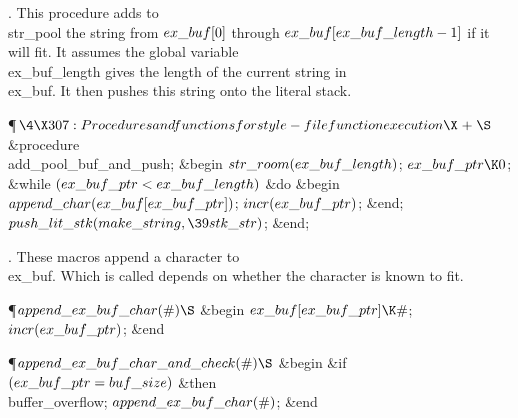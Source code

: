 .
This procedure adds to \\{str\_pool} the string from $\\{ex\_buf}[0]$ through
$\\{ex\_buf}[\\{ex\_buf\_length}-1]$ if it will fit.  It assumes the global
variable \\{ex\_buf\_length} gives the length of the current string in
\\{ex\_buf}.  It then pushes this string onto the literal stack.

\Y\P$\4\X307:Procedures and functions for style-file function execution\X%
\mathrel{+}\S$\6
\4\&{procedure}\1\  \\{add\_pool\_buf\_and\_push};\2\6
\&{begin} $\\{str\_room}(\\{ex\_buf\_length})$;\6
$\\{ex\_buf\_ptr}\K0$;\6
\&{while} $(\\{ex\_buf\_ptr}<\\{ex\_buf\_length})$ \1\&{do}\6
\&{begin} $\\{append\_char}(\\{ex\_buf}[\\{ex\_buf\_ptr}])$;\5
$\\{incr}(\\{ex\_buf\_ptr})$;\6
\&{end};\2\6
$\\{push\_lit\_stk}(\\{make\_string},\39\\{stk\_str})$;\6
\&{end};\par
\fi

.
These macros append a character to \\{ex\_buf}.  Which is called depends
on whether the character is known to fit.

\Y\P\D {}$\\{append\_ex\_buf\_char}(\#)\S$\1\6
\&{begin} $\\{ex\_buf}[\\{ex\_buf\_ptr}]\K\#$;\5
$\\{incr}(\\{ex\_buf\_ptr})$;\6
\&{end}\2\par
\P\D {}$\\{append\_ex\_buf\_char\_and\_check}(\#)\S$\1\6
\&{begin} \&{if} $(\\{ex\_buf\_ptr}=\\{buf\_size})$ \1\&{then}\5
\\{buffer\_overflow};\2\6
$\\{append\_ex\_buf\_char}(\#)$;\6
\&{end}\2\par
\fi

